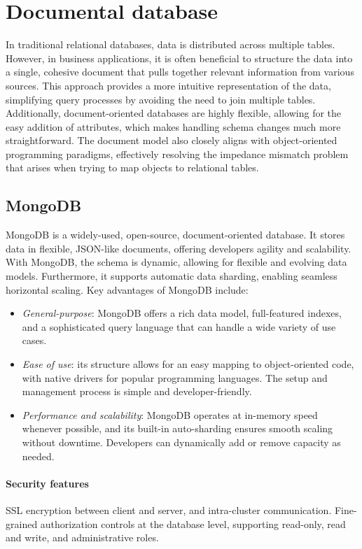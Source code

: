 \section{Documental database}

In traditional relational databases, data is distributed across multiple tables. 
However, in business applications, it is often beneficial to structure the data into a single, cohesive document that pulls together relevant information from various sources. 
This approach provides a more intuitive representation of the data, simplifying query processes by avoiding the need to join multiple tables. 
Additionally, document-oriented databases are highly flexible, allowing for the easy addition of attributes, which makes handling schema changes much more straightforward. 
The document model also closely aligns with object-oriented programming paradigms, effectively resolving the impedance mismatch problem that arises when trying to map objects to relational tables.

\subsection{MongoDB}
MongoDB is a widely-used, open-source, document-oriented database. 
It stores data in flexible, JSON-like documents, offering developers agility and scalability. With MongoDB, the schema is dynamic, allowing for flexible and evolving data models. 
Furthermore, it supports automatic data sharding, enabling seamless horizontal scaling.
Key advantages of MongoDB include: 
\begin{itemize} 
    \item \textit{General-purpose}: MongoDB offers a rich data model, full-featured indexes, and a sophisticated query language that can handle a wide variety of use cases. 
    \item \textit{Ease of use}: its structure allows for an easy mapping to object-oriented code, with native drivers for popular programming languages. 
        The setup and management process is simple and developer-friendly. 
    \item \textit{Performance and scalability}: MongoDB operates at in-memory speed whenever possible, and its built-in auto-sharding ensures smooth scaling without downtime. 
        Developers can dynamically add or remove capacity as needed. 
\end{itemize}

\paragraph*{Security features} 
SSL encryption between client and server, and intra-cluster communication. 
Fine-grained authorization controls at the database level, supporting read-only, read and write, and administrative roles.

